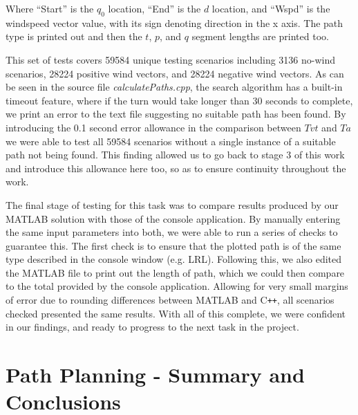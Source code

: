 Where ``Start'' is the $q_0$ location, ``End'' is the $d$ location, and ``Wspd'' is the windspeed vector value, with its sign denoting direction in the x axis. The path type is printed out and then the $t$, $p$, and $q$ segment lengths are printed too. 

This set of tests covers 59584 unique testing scenarios including 3136 no-wind scenarios, 28224 positive wind vectors, and 28224 negative wind vectors. As can be seen in the source file \textit{calculatePaths.cpp}, the search algorithm has a built-in timeout feature, where if the turn would take longer than 30 seconds to complete, we print an error to the text file suggesting no suitable path has been found. By introducing the 0.1 second error allowance in the comparison between $Tvt$ and $Ta$ we were able to test all 59584 scenarios without a single instance of a suitable path not being found. This finding allowed us to go back to stage 3 of this work and introduce this allowance here too, so as to ensure continuity throughout the work. 

The final stage of testing for this task was to compare results produced by our MATLAB solution with those of the console application. By manually entering the same input parameters into both, we were able to run a series of checks to guarantee this. The first check is to ensure that the plotted path is of the same type described in the console window (e.g. LRL). Following this, we also edited the MATLAB file to print out the length of path, which we could then compare to the total provided by the console application. Allowing for very small margins of error due to rounding differences between MATLAB and C\texttt{++}, all scenarios checked presented the same results. With all of this complete, we were confident in our findings, and ready to progress to the next task in the project.

\section{Path Planning - Summary and Conclusions}
\label{task1:summary}
